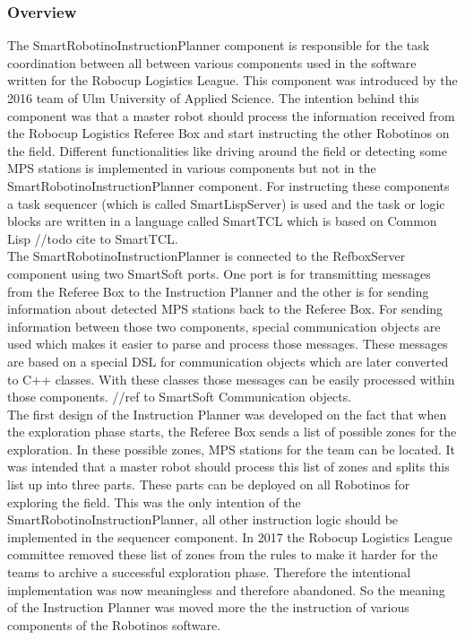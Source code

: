 \subsubsection{Overview}
\label{sec:inst_overview}

The SmartRobotinoInstructionPlanner component is responsible for the task coordination between all between various components used in the software written for the 
Robocup Logistics League. This component was introduced by the 2016 team of Ulm University of Applied Science. The intention behind this component was that a master robot should process the information received from the Robocup Logistics Referee Box and start instructing the other Robotinos on the field. Different functionalities like driving around the field or detecting some MPS stations is implemented in various components but not in the SmartRobotinoInstructionPlanner component. For instructing these components a task sequencer (which is called SmartLispServer) is used and the task or logic blocks are written in a language called SmartTCL which is based on Common Lisp //todo cite to SmartTCL. \\ 

The SmartRobotinoInstructionPlanner is connected to the RefboxServer component using two SmartSoft ports. One port is for transmitting messages from the Referee Box to the Instruction Planner and the other is for sending information about detected MPS stations back to the Referee Box. For sending information between those two components, special communication objects are used which makes it easier to parse and process those messages. These messages are based on a special DSL for communication objects which are later converted to C++ classes. With these classes those messages can be easily processed within those components. //ref to SmartSoft Communication objects. \\

The first design of the Instruction Planner was developed on the fact that when the exploration phase starts, the Referee Box sends a list of possible zones for the exploration. In these possible zones, MPS stations for the team can be located. It was intended that a master robot should process this list of zones and splits this list up into three parts. These parts can be deployed on all Robotinos for exploring the field. This was the only intention of the SmartRobotinoInstructionPlanner, all other instruction logic should be implemented in the sequencer component. In 2017 the Robocup Logistics League committee removed these list of zones from the rules to make it harder for the teams to archive a successful exploration phase. Therefore the intentional implementation was now meaningless and therefore abandoned. So the meaning of the Instruction Planner was moved more the the instruction of various components of the Robotinos software. \\


